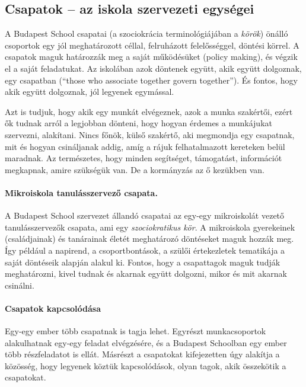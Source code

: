 \subsection{Csapatok -- az iskola szervezeti egységei}

A Budapest School csapatai (a szociokrácia terminológiájában a \emph{körök}) önálló csoportok egy jól meghatározott céllal, felruházott felelősséggel, döntési körrel. A csapatok maguk határozzák meg a saját működésüket (policy making), és végzik el a saját feladatukat. Az iskolában azok döntenek együtt, akik együtt dolgoznak, egy csapatban (``those who associate together govern together''). És fontos, hogy akik együtt dolgoznak, jól legyenek egy\-mással.

Azt is tudjuk, hogy akik egy munkát elvégeznek, azok a munka szak\-ér\-tői, ezért ők tudnak arról a legjobban dönteni, hogy hogyan érdemes a munká\-ju\-kat szervezni, alakítani. Nincs főnök, külső szakértő, aki megmondja egy csapatnak, mit és hogyan csináljanak addig, amíg a rájuk felhatalmazott kereteken belül maradnak. Az természetes, hogy minden segítséget, támogatást, információt megkapnak, amire szükségük van. De a kormányzás az ő kezükben van.

\paragraph{Mikroiskola tanulásszervező csapata.}

A Budapest School szervezet állandó csapatai az egy-egy mikroiskolát vezető tanulásszervezők csapata, ami egy \emph{szociokratikus kör}. A mikroiskola gyerekeinek (családjainak) és tanárainak életét meghatározó döntéseket maguk hozzák meg. Így például a napirend, a csoportbontások, a szülői értekezletek tematikája a saját döntéseik alapján alakul ki. Fontos, hogy a csapattagok maguk tudják meghatározni, kivel tudnak és akarnak együtt dolgozni, mikor és mit akarnak csinálni.

\paragraph{Csapatok kapcsolódása}

Egy-egy ember több csapatnak is tagja lehet. Egyrészt munkacsoportok alakulhatnak egy-egy feladat elvégzésére, és a Budapest Schoolban egy ember több részfeladatot is ellát. Másrészt a csapatokat kifejezetten úgy alakítja a közösség, hogy legyenek köztük kapcsolódások, olyan tagok, akik összekötik a csapatokat.

